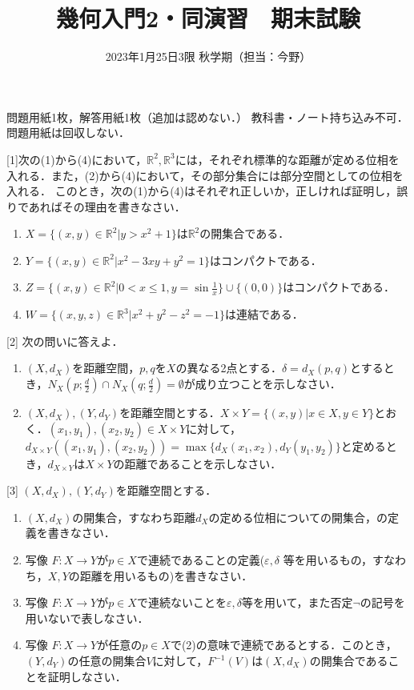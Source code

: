 \documentclass{jlreq}
\title{幾何入門2・同演習　期末試験}
\date{2023年1月25日3限 秋学期（担当：今野）}
\begin{document}
\maketitle
問題用紙1枚，解答用紙1枚（追加は認めない．）
教科書・ノート持ち込み不可．問題用紙は回収しない．
\vspace{0.5cm}

[1]次の(1)から(4)において，$\mathbb{R}^2,\mathbb{R}^3$には，それぞれ標準的な距離が定める位相を入れる．また，(2)から(4)において，その部分集合には部分空間としての位相を入れる．
このとき，次の(1)から(4)はそれぞれ正しいか，正しければ証明し，誤りであればその理由を書きなさい．
\begin{enumerate}
\def \labelenumi{(\theenumi)}
\item $X=\{(x,y) \in \mathbb{R}^2| y>x^2+1\}$は$\mathbb{R}^2$の開集合である．
\item $Y=\{(x,y) \in \mathbb{R}^2| x^2-3xy+y^2=1\}$はコンパクトである．
\item $Z=\{(x,y) \in \mathbb{R}^2| 0<x \leq 1 , y=\sin \frac{1}{x}\} \cup \{(0,0)\}$はコンパクトである．
\item $W=\{(x,y,z) \in \mathbb{R}^3| x^2+y^2-z^2=-1\}$は連結である．
\end{enumerate}

[2] 次の問いに答えよ．
\begin{enumerate}
\def \labelenumi{(\theenumi)}
\item $(X, d_X)$を距離空間，$p, q$を$X$の異なる2点とする．$\delta=d_X(p,q)$とするとき，$N_X(p;\frac{d}{2}) \cap N_X(q;\frac{d}{2}) =\emptyset$が成り立つことを示しなさい．
\item $(X, d_X), (Y,d_Y)$を距離空間とする．$X \times Y=\{(x,y)| x \in X, y \in Y\}$とおく．$(x_1, y_1), (x_2, y_2) \in X \times Y$に対して，$d_{X \times Y}((x_1, y_1), (x_2, y_2))=
\max \{d_X(x_1, x_2), d_Y(y_1, y_2)\}$と定めるとき，$d_{X \times Y}$は$X \times Y$の距離であることを示しなさい．
\end{enumerate}

[3] $(X, d_X), (Y,d_Y)$を距離空間とする．
\begin{enumerate}
\def \labelenumi{(\theenumi)}
\item $(X, d_X)$の開集合，すなわち距離$d_X$の定める位相についての開集合，の定義を書きなさい．
\item 写像 $F: X \rightarrow Y$が$p \in X$で連続であることの定義($\varepsilon, \delta$ 等を用いるもの，すなわち，$X,Y$の距離を用いるもの)を書きなさい．
\item 写像 $F: X \rightarrow Y$が$p \in X$で連続ないことを$\varepsilon, \delta$等を用いて，また否定$\neg$の記号を用いないで表しなさい．
\item 写像 $F: X \rightarrow Y$が任意の$p \in X$で(2)の意味で連続であるとする．このとき，$(Y,d_Y)$の任意の開集合$V$に対して，$F^{-1}(V)$は$(X, d_X)$の開集合であることを証明しなさい．
\end{enumerate}
\end{document}
